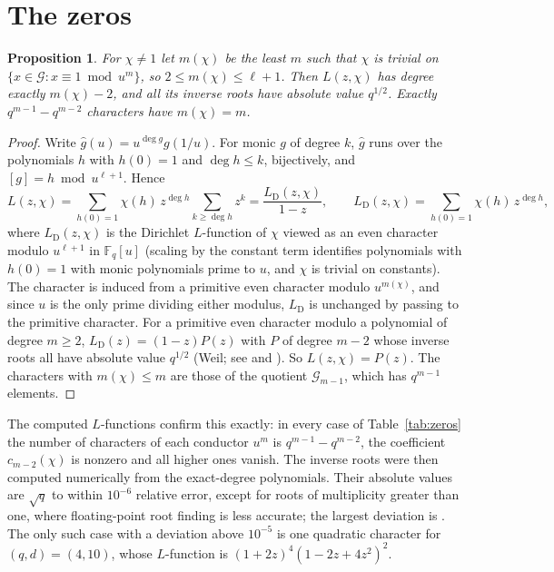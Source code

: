 \documentclass[11pt,a4paper]{article}
\newtheorem{proposition}[theorem]{Proposition}
\theoremstyle{definition}
\theoremstyle{remark}
\newcommand{\Fq}{\mathbb{F}_q}
\newcommand{\cG}{\mathcal{G}}
\begin{document}
\section{The zeros}\label{sec:zeros}

\begin{proposition}\label{prop:conductor}
For $\chi\ne1$ let $m(\chi)$ be the least $m$ such that $\chi$ is trivial on $\{x\in\cG:x\equiv1\bmod u^m\}$,
so $2\le m(\chi)\le\ell+1$. Then $L(z,\chi)$ has degree exactly $m(\chi)-2$, and all its inverse roots have
absolute value $q^{1/2}$. Exactly $q^{m-1}-q^{m-2}$ characters have $m(\chi)=m$.
\end{proposition}

\begin{proof}
Write $\hat g(u)=u^{\deg g}g(1/u)$. For monic $g$ of degree $k$, $\hat g$ runs over the polynomials $h$ with
$h(0)=1$ and $\deg h\le k$, bijectively, and $[g]=h\bmod u^{\ell+1}$. Hence
\[
 L(z,\chi)=\sum_{h(0)=1}\chi(h)\,z^{\deg h}\sum_{k\ge\deg h}z^k=\frac{L_{\mathrm{D}}(z,\chi)}{1-z},\qquad
 L_{\mathrm D}(z,\chi)=\sum_{h(0)=1}\chi(h)\,z^{\deg h},
\]
where $L_{\mathrm D}(z,\chi)$ is the Dirichlet $L$-function of $\chi$ viewed as an
even character modulo $u^{\ell+1}$ in $\Fq[u]$ (scaling by the constant term identifies polynomials with $h(0)=1$
with monic polynomials prime to $u$, and $\chi$ is trivial on constants). The character is induced from a
primitive even character modulo $u^{m(\chi)}$, and since $u$ is the only prime dividing either modulus,
$L_{\mathrm D}$ is unchanged by passing to the primitive character. For a primitive even character modulo a
polynomial of degree $m\ge2$, $L_{\mathrm D}(z)=(1-z)P(z)$ with $P$ of degree $m-2$ whose inverse roots all
have absolute value $q^{1/2}$ (Weil; see \cite[Ch.~4]{Rosen2002} and \cite[\S4]{KR2014}). So
$L(z,\chi)=P(z)$. The characters with $m(\chi)\le m$ are those of the quotient $\cG_{m-1}$, which has $q^{m-1}$
elements.
\end{proof}

The computed $L$-functions confirm this exactly: in every case of Table~\ref{tab:zeros} the number of
characters of each conductor $u^m$ is $q^{m-1}-q^{m-2}$, the coefficient $c_{m-2}(\chi)$ is nonzero and all
higher ones vanish. The inverse roots were then computed numerically from the exact-degree polynomials. Their
absolute values are $\sqrt q$ to within $10^{-6}$ relative error, except for roots of multiplicity greater
than one, where floating-point root finding is less accurate; the largest deviation is \MaxRootDev. The only
such case with a deviation above $10^{-5}$ is one quadratic character for $(q,d)=(4,10)$, whose $L$-function is
$(1+2z)^4(1-2z+4z^2)^2$.
\end{document}
